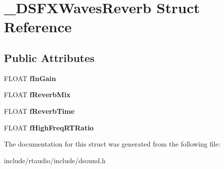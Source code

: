 \hypertarget{struct___d_s_f_x_waves_reverb}{}\section{\+\_\+\+D\+S\+F\+X\+Waves\+Reverb Struct Reference}
\label{struct___d_s_f_x_waves_reverb}
\subsection*{Public Attributes}
\begin{DoxyCompactItemize}
\item 
F\+L\+O\+AT {\bfseries f\+In\+Gain}\hypertarget{struct___d_s_f_x_waves_reverb_a6a3e3b19f25ba2388f535a89ab495ee4}{}\label{struct___d_s_f_x_waves_reverb_a6a3e3b19f25ba2388f535a89ab495ee4}

\item 
F\+L\+O\+AT {\bfseries f\+Reverb\+Mix}\hypertarget{struct___d_s_f_x_waves_reverb_a25b4940d31015ce2eb26dbe064b49819}{}\label{struct___d_s_f_x_waves_reverb_a25b4940d31015ce2eb26dbe064b49819}

\item 
F\+L\+O\+AT {\bfseries f\+Reverb\+Time}\hypertarget{struct___d_s_f_x_waves_reverb_a02cc7ad0a46c8bdad64445d46a515b10}{}\label{struct___d_s_f_x_waves_reverb_a02cc7ad0a46c8bdad64445d46a515b10}

\item 
F\+L\+O\+AT {\bfseries f\+High\+Freq\+R\+T\+Ratio}\hypertarget{struct___d_s_f_x_waves_reverb_a6ab54e2b41dac6a0bd830700c9cfad96}{}\label{struct___d_s_f_x_waves_reverb_a6ab54e2b41dac6a0bd830700c9cfad96}

\end{DoxyCompactItemize}


The documentation for this struct was generated from the following file\+:\begin{DoxyCompactItemize}
\item 
include/rtaudio/include/dsound.\+h\end{DoxyCompactItemize}
